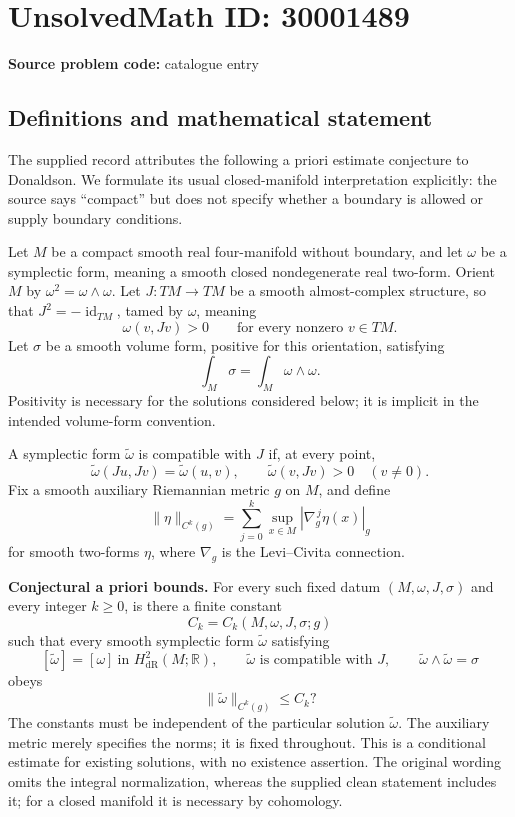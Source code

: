 \documentclass[11pt]{article}
\newcommand{\R}{\mathbb{R}}
\begin{document}
\section*{UnsolvedMath ID: 30001489}
\textbf{Source problem code:} catalogue entry
\subsection{Definitions and mathematical statement}
The supplied record attributes the following a priori estimate conjecture to Donaldson. We formulate its usual closed-manifold interpretation explicitly: the source says ``compact'' but does not specify whether a boundary is allowed or supply boundary conditions.

Let \(M\) be a compact smooth real four-manifold without boundary, and let \(\omega\) be a symplectic form, meaning a smooth closed nondegenerate real two-form. Orient \(M\) by \(\omega^2=\omega\wedge\omega\). Let \(J:TM\to TM\) be a smooth almost-complex structure, so that \(J^2=-\operatorname{id}_{TM}\), tamed by \(\omega\), meaning
\[
\omega(v,Jv)>0\qquad\text{for every nonzero }v\in TM.
\]
Let \(\sigma\) be a smooth volume form, positive for this orientation, satisfying
\[
\int_M\sigma=\int_M\omega\wedge\omega.
\]
Positivity is necessary for the solutions considered below; it is implicit in the intended volume-form convention.

A symplectic form \(\widetilde\omega\) is compatible with \(J\) if, at every point,
\[
\widetilde\omega(Ju,Jv)=\widetilde\omega(u,v),\qquad
\widetilde\omega(v,Jv)>0\quad(v\ne0).
\]
Fix a smooth auxiliary Riemannian metric \(g\) on \(M\), and define
\[
\|\eta\|_{C^k(g)}=\sum_{j=0}^{k}\sup_{x\in M}|\nabla_g^{\,j}\eta(x)|_g
\]
for smooth two-forms \(\eta\), where \(\nabla_g\) is the Levi--Civita connection.

\textbf{Conjectural a priori bounds.} For every such fixed datum \((M,\omega,J,\sigma)\) and every integer \(k\ge0\), is there a finite constant
\[
C_k=C_k(M,\omega,J,\sigma;g)
\]
such that every smooth symplectic form \(\widetilde\omega\) satisfying
\[
[\widetilde\omega]=[\omega]\ \text{in }H^2_{\mathrm{dR}}(M;\R),\qquad
\widetilde\omega\text{ is compatible with }J,\qquad
\widetilde\omega\wedge\widetilde\omega=\sigma
\]
obeys
\[
\|\widetilde\omega\|_{C^k(g)}\le C_k?
\]
The constants must be independent of the particular solution \(\widetilde\omega\). The auxiliary metric merely specifies the norms; it is fixed throughout. This is a conditional estimate for existing solutions, with no existence assertion. The original wording omits the integral normalization, whereas the supplied clean statement includes it; for a closed manifold it is necessary by cohomology.
\end{document}
